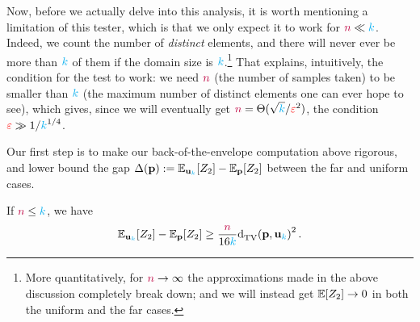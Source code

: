 Now, before we actually delve into this analysis, it is worth mentioning a limitation of this tester, which is that we only expect it to work for ${\textcolor{purple}{n}} \ll {\textcolor{cyan}{k}}$. Indeed, we count the number of \emph{distinct} elements, and there will never ever be more than ${\textcolor{cyan}{k}}$ of them if the domain size is ${\textcolor{cyan}{k}}$.\footnote{More quantitatively, for ${\textcolor{purple}{n}} \to \infty$ the approximations made in the above discussion completely break down; and we will instead get $\expect{Z_2} \to 0$ in both the uniform and the far cases.} That explains, intuitively, the condition for the test to work: we need ${\textcolor{purple}{n}}$ (the number of samples taken) to be smaller than ${\textcolor{cyan}{k}}$ (the maximum number of distinct elements one can ever hope to see), which gives, since we will eventually get ${\textcolor{purple}{n}} = \Theta(\sqrt{{\textcolor{cyan}{k}}}/\textcolor{red}{\varepsilon}^2)$, the condition $\textcolor{red}{\varepsilon} \gg 1/{\textcolor{cyan}{k}}^{1/4}$.

Our first step is to make our back-of-the-envelope computation above rigorous, and lower bound the gap $\Delta(\p) \eqdef \bE{\uniform_\ab}{Z_2} - \bE{\p}{Z_2}$ between the far and uniform cases.
\begin{lemma}
  \label{lemma:gap:z2}
If ${\textcolor{purple}{n}} \leq {\textcolor{cyan}{k}}$, we have
\[
    \bE{\uniform_\ab}{Z_2} - \bE{\p}{Z_2} \geq \frac{\ns}{16\ab}\totalvardist{\p}{\uniform_\ab}^2\,.
\]
\end{lemma}
